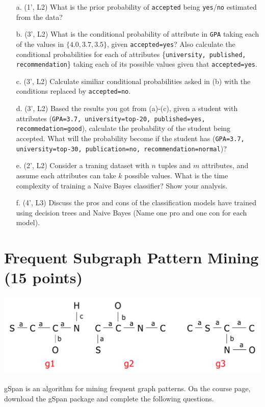 \documentclass[12pt,letterpaper]{article}
\begin{document}
				\begin{itemize}
					\item[a.]  (1', L2) What is the prior probability of {\tt accepted} being {\tt yes}/{\tt no} estimated from the data?
					\item[b.] (3', L2) What is the conditional probability of attribute in {\tt GPA} taking each of the values in $\{4.0, 3.7, 3.5\}$, given {\tt accepted=yes}? Also calculate the conditional probabilities for each of attributes \{{\tt university, published, recommendation}\} taking each of its possible values given that {\tt accepted=yes}.
					\item[c.] (3', L2) Calculate similiar conditional probabilities asked in (b) with the conditions replaced by {\tt accepted=no}.
					\item[d.] (3', L2) Based the results you got from (a)-(c), given a student with attributes ({\tt GPA=3.7, university=top-20, published=yes, recommedation=good}), calculate the probability of the student being accepted. What will the probability become if the student has ({\tt GPA=3.7, university=top-30, publication=no, recommendation=normal})?
					\item[e.] (2', L2) Consider a traning dataset with $n$ tuples and $m$ attributes, and assume each attributes can take $k$ possible values. What is the time complexity of training a Naive Bayes classifier? Show your analysis.
					\item[f.] (4', L3) Discuss the pros and cons of the classification models have trained using decision trees and Naive Bayes (Name one pro and one con for each model).
				\end{itemize}
				
				
				\section{Frequent Subgraph Pattern Mining (15 points)}
				\begin{center}
					\includegraphics[scale=0.5]{gspan.png} 
				\end{center}
				gSpan is an algorithm for mining frequent graph patterns. On the course page, download the gSpan package and complete the following questions.\\
				
\end{document}
